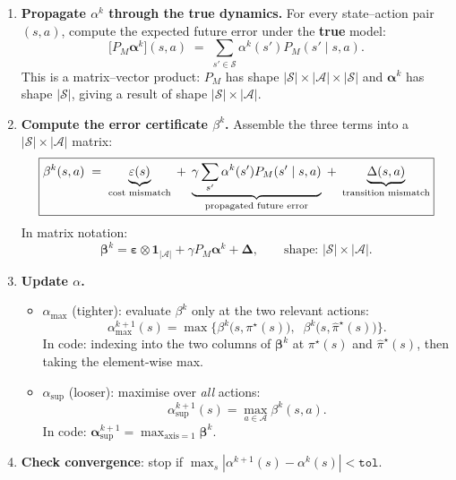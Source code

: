 \documentclass[11pt]{article}
\newcommand{\pistar}{\pi^\star}
\newcommand{\pihatstar}{\hat\pi^\star}
\begin{document}
\begin{enumerate}
\item \textbf{Propagate $\alpha^k$ through the true dynamics.}
For every state--action pair $(s, a)$, compute the expected future error
under the \textbf{true} model:
\begin{equation}\label{eq:propagate-q}
  \bigl[P_M \boldsymbol{\alpha}^k\bigr](s, a)
  \;=\; \sum_{s' \in \mathcal{S}} \alpha^k(s')  P_M(s' \mid s, a).
\end{equation}
This is a matrix--vector product: $P_M$ has shape $|\mathcal{S}| \times
|\mathcal{A}| \times |\mathcal{S}|$ and $\boldsymbol{\alpha}^k$ has shape
$|\mathcal{S}|$, giving a result of shape $|\mathcal{S}| \times |\mathcal{A}|$.

\item \textbf{Compute the error certificate $\beta^k$.}
Assemble the three terms into a $|\mathcal{S}| \times |\mathcal{A}|$ matrix:
\begin{equation}\label{eq:beta-q}
  \boxed{%
    \beta^k(s, a)
    \;=\; \underbrace{\varepsilon(s)}_{\text{cost mismatch}}
    \;+\; \underbrace{\gamma \sum_{s'} \alpha^k(s')  P_M(s' \mid s, a)}_{\text{propagated future error}}
    \;+\; \underbrace{\Delta(s, a)}_{\text{transition mismatch}}
  }
\end{equation}
In matrix notation:
\[
  \boldsymbol{\beta}^k
  = \boldsymbol{\varepsilon} \otimes \mathbf{1}_{|\mathcal{A}|}
  + \gamma  P_M \boldsymbol{\alpha}^k
  + \boldsymbol{\Delta},
  \qquad \text{shape: } |\mathcal{S}| \times |\mathcal{A}|.
\]

\item \textbf{Update $\alpha$.}
\begin{itemize}
  \item $\alpha_{\max}$ (tighter): evaluate $\beta^k$ only at the two relevant
        actions:
  \begin{equation}\label{eq:alpha-max-q}
    \alpha^{k+1}_{\max}(s) = \max\!\Big\{
      \beta^k\bigl(s,  \pistar(s)\bigr),\;\;
      \beta^k\bigl(s,  \pihatstar(s)\bigr)
    \Big\}.
  \end{equation}
  In code: indexing into the two columns of $\boldsymbol{\beta}^k$ at
  $\pistar(s)$ and $\pihatstar(s)$, then taking the element-wise max.

  \item $\alpha_{\sup}$ (looser): maximise over \emph{all} actions:
  \begin{equation}\label{eq:alpha-sup-q}
    \alpha^{k+1}_{\sup}(s) = \max_{a \in \mathcal{A}}  \beta^k(s, a).
  \end{equation}
  In code: $\boldsymbol{\alpha}^{k+1}_{\sup} = \max_{\text{axis}=1}
  \boldsymbol{\beta}^k$.
\end{itemize}

\item \textbf{Check convergence}: stop if
$\max_s |\alpha^{k+1}(s) - \alpha^k(s)| < \texttt{tol}$.
\end{enumerate}
\end{document}
